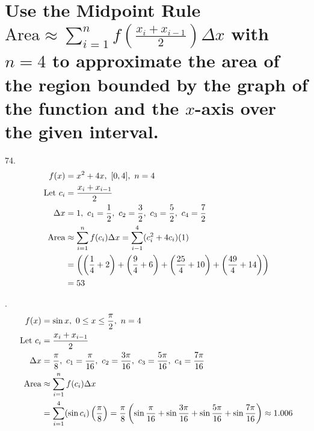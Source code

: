 \documentclass[11pt]{article}
\newcommand*{\vs}{\vspace{1cm}}
\newcommand*{\next}{\noindent}
\newcommand*{\set}{\setcounter{equation}{0}}
\begin{document}
\section{Use the Midpoint Rule $\text{Area}\approx\sum_{i=1}^{n}f\left(\frac{x_i+x_{i-1}}{2}\right)\Delta x$ with $n=4$ to approximate the area of the region bounded
by the graph of the function and the $x$-axis over the given
interval.}
74.\begin{align}
    \set
    f(x)&=x^2+4x,\,\,[0, 4],\,\, n=4\\
    \text{Let}\,\, c_i&=\frac{x_i+x_{i-1}}{2}\\
    \Delta x&=1,\,\, c_1=\frac{1}{2},\,\, c_2=\frac{3}{2},\,\, c_3=\frac{5}{2},\,\, c_4=\frac{7}{2}\\
    \text{Area}&\approx \sum_{i=1}^{n}f(c_i)\Delta x=\sum_{i-1}^{4}(c_i^2+4c_i)(1)\\
    &=\left(\left(\frac{1}{4}+2\right)+\left(\frac{9}{4}+6\right)+\left(\frac{25}{4}+10\right)+\left(\frac{49}{4}+14\right)\right)\\
    &=53
\end{align}

\vs\next
76.\begin{align}
    \set
    f(x)&=\sin x,\,\, 0\leq x\leq\frac{\pi}{2},\,\, n=4\\
    \text{Let}\,\, c_i&=\frac{x_i+x_{i-1}}{2}\\
    \Delta x&=\frac{\pi}{8},\,\, c_1=\frac{\pi}{16},\,\, c_2=\frac{3\pi}{16},\,\, c_3=\frac{5\pi}{16},\,\, c_4=\frac{7\pi}{16}\\
    \text{Area}&\approx\sum_{i=1}^{n}f(c_i)\Delta x\\
    &=\sum_{i=1}^{4}(\sin c_i)\left(\frac{\pi}{8}\right)=\frac{\pi}{8}\left(\sin\frac{\pi}{16}+\sin\frac{3\pi}{16}+\sin\frac{5\pi}{16}+\sin\frac{7\pi}{16}\right)\approx 1.006
\end{align}
\end{document}
